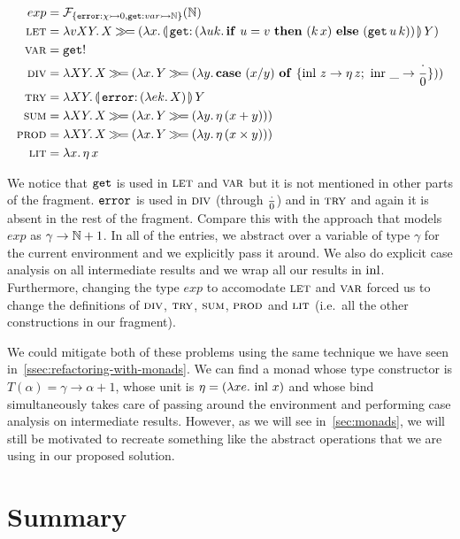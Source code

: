\begin{align*}
  exp &= \FF_{\{\typedop{error}{\chi}{0},\typedop{get}{var}{\NN}\}}(\NN) \\
  \lete &= \lam{v X Y}{X \hsbind
    (\lam{x}{\ap{\banana{\onto{\op{get}}{(\lam{u k}{\ifte{u = v}{(\ap{k}{x})}{(\app{\op{get}}{u}{k})}})}}}{Y}})} \\
  \vare &= \op{get}! \\
  \dive &= \lam{X Y}{X \hsbind (\lam{x}{Y \hsbind (\lam{y}{\case{(x / y)}{z}{\ap{\eta}{z}}{\_}{\dbze}})})} \\
  \trye &= \lam{X Y}{\ap{\banana{\onto{\op{error}}{(\lam{e k}{X})}}}{Y}} \\
  \sume &= \lam{X Y}{X \hsbind (\lam{x}{Y \hsbind (\lam{y}{\ap{\eta}{(x + y)}})})} \\
  \prode &= \lam{X Y}{X \hsbind (\lam{x}{Y \hsbind (\lam{y}{\ap{\eta}{(x \times y)}})})} \\
  \lite &= \lam{x}{\etaE{x}}
\end{align*}

We notice that $\mathtt{get}$ is used in $\textsc{let}$ and $\textsc{var}$ but it is not
mentioned in other parts of the fragment. $\mathtt{error}$ is used in $\textsc{div}$
(through $\frac{\cdot}{0}$) and in $\textsc{try}$ and again it is absent in the rest of the
fragment. Compare this with the approach that models $exp$ as $\gamma \to
\mathbb{N} + 1$. In all of the entries, we abstract over a variable of type
$\gamma$ for the current environment and we explicitly pass it around. We
also do explicit case analysis on all intermediate results and we wrap all
our results in $\operatorname{inl}$. Furthermore, changing the type $exp$ to accomodate
$\textsc{let}$ and $\textsc{var}$ forced us to change the definitions of $\textsc{div}$,
$\textsc{try}$, $\textsc{sum}$, $\textsc{prod}$ and $\textsc{lit}$ (i.e.\ all the other constructions
in our fragment).

We could mitigate both of these problems using the same technique we have
seen in~\ref{ssec:refactoring-with-monads}. We can find a monad whose type
constructor is $T(\alpha) = \gamma \to \alpha + 1$, whose unit is $\eta =
(\lambda x e.\, \operatorname{inl}\,x)$ and whose bind simultaneously takes care of
passing around the environment and performing case analysis on intermediate
results. However, as we will see in~\ref{sec:monads}, we will still be
motivated to recreate something like the abstract operations that we are
using in our proposed solution.


\section{Summary}

